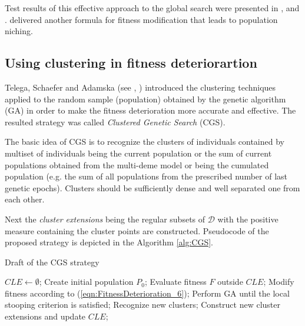 Test results of this effective approach to the global search were presented in  \cite{Obuchowicz1999}, \cite{ObuchowiczPatan1997b} and \cite{ObuchowiczKorbicz1999}.
\cite{Arabas2001} delivered another formula for fitness modification that leads to
population niching.














\subsection{Using clustering in fitness deteriorartion}
\label{sec:CGS}



Telega, Schaefer and Adamska (see \cite{Telega1999}, \cite{SchaeferAdamskaTelega2004})
introduced the clustering techniques applied to the random sample (population)
obtained by the genetic algorithm (GA) in order to make the fitness deterioration
more accurate and effective.
The resulted strategy was called \textit{Clustered Genetic Search} (CGS).

The basic idea of CGS is to recognize the clusters of individuals contained by
multiset of individuals being the current population or the sum of current
populations obtained from the multi-deme model or being the cumulated population
(e.g. the sum of all populations from the prescribed number of last genetic epochs).
Clusters should be sufficiently dense and well separated one from each other.

Next the \textit{cluster extensions} being the regular subsets of $\mathcal{D}$
with the positive measure containing the cluster points are constructed.
Pseudocode of the proposed strategy is depicted in the Algorithm \ref{alg:CGS}.
\begin{algorithm}
\caption{Draft of the CGS strategy}
\label{alg:CGS}
\begin{algorithmic}[1]
\STATE $CLE \leftarrow \emptyset$;
\STATE Create initial population $P_0$;
\REPEAT
\STATE Evaluate fitness $F$ outside $CLE$;
\STATE Modify fitness according to (\ref{eqn:FitnessDeterioration_6});
\STATE Perform GA until the local stooping criterion is satisfied;
\STATE Recognize new clusters;
\STATE Construct new cluster extensions and update $CLE$;
\end{algorithmic}
\end{algorithm}

